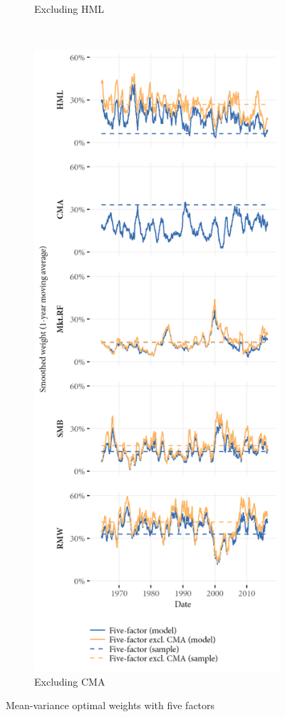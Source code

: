 \begin{figure}[p]
\begin{subfigure}{0.45\textwidth}
    \caption{Excluding HML}
  \end{subfigure}
  ~
  \begin{subfigure}{0.45\textwidth}
    \includegraphics[width=\textwidth]{graphics/weights/main_Weights_MV_5F_EXCL_CMA_5F.png}
    \caption{Excluding CMA}
  \end{subfigure}  
  \caption{Mean-variance optimal weights with five factors}
  \label{fig:mv_optimal_5}


\end{figure}

